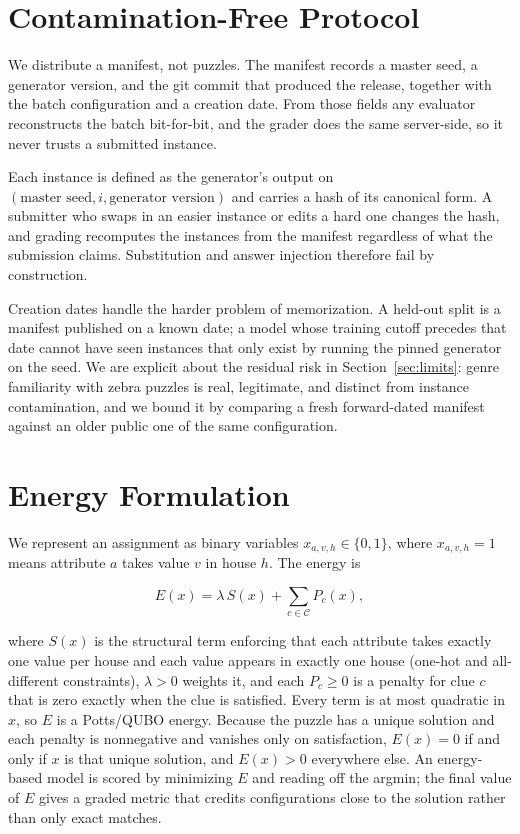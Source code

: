 \documentclass[11pt]{article}
\begin{document}
\section{Contamination-Free Protocol}

We distribute a manifest, not puzzles. The manifest records a master seed, a
generator version, and the git commit that produced the release, together with the
batch configuration and a creation date. From those fields any evaluator
reconstructs the batch bit-for-bit, and the grader does the same server-side, so
it never trusts a submitted instance.

Each instance is defined as the generator's output on $(\text{master seed}, i,
\text{generator version})$ and carries a hash of its canonical form. A submitter
who swaps in an easier instance or edits a hard one changes the hash, and grading
recomputes the instances from the manifest regardless of what the submission
claims. Substitution and answer injection therefore fail by construction.

Creation dates handle the harder problem of memorization. A held-out split is a
manifest published on a known date; a model whose training cutoff precedes that
date cannot have seen instances that only exist by running the pinned generator on
the seed. We are explicit about the residual risk in Section~\ref{sec:limits}:
genre familiarity with zebra puzzles is real, legitimate, and distinct from
instance contamination, and we bound it by comparing a fresh forward-dated
manifest against an older public one of the same configuration.

\section{Energy Formulation}

We represent an assignment as binary variables $x_{a,v,h} \in \{0,1\}$, where
$x_{a,v,h}=1$ means attribute $a$ takes value $v$ in house $h$. The energy is

\begin{equation}
E(x) = \lambda \, S(x) + \sum_{c \in \mathcal{C}} P_c(x),
\end{equation}

where $S(x)$ is the structural term enforcing that each attribute takes exactly
one value per house and each value appears in exactly one house (one-hot and
all-different constraints), $\lambda > 0$ weights it, and each $P_c \geq 0$ is a
penalty for clue $c$ that is zero exactly when the clue is satisfied. Every term is
at most quadratic in $x$, so $E$ is a Potts/QUBO energy. Because the puzzle has a
unique solution and each penalty is nonnegative and vanishes only on satisfaction,
$E(x) = 0$ if and only if $x$ is that unique solution, and $E(x) > 0$ everywhere
else. An energy-based model is scored by minimizing $E$ and reading off the
argmin; the final value of $E$ gives a graded metric that credits configurations
close to the solution rather than only exact matches.
\end{document}
